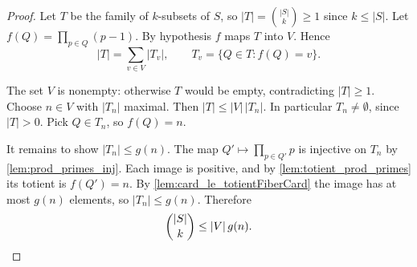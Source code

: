 \documentclass[11pt]{article}
\theoremstyle{definition}
\theoremstyle{remark}
\begin{document}
\begin{proof}
Let $T$ be the family of $k$-subsets of $S$, so $|T|=\binom{|S|}{k}\ge1$ since $k\le|S|$. Let $f(Q)=\prod_{p\in Q}(p-1)$. By hypothesis $f$ maps $T$ into $V$. Hence
\[
 |T|=\sum_{v\in V}|T_v|,\qquad T_v=\{Q\in T: f(Q)=v\}.
\]

The set $V$ is nonempty: otherwise $T$ would be empty, contradicting $|T|\ge1$. Choose $n\in V$ with $|T_n|$ maximal. Then $|T|\le|V|\,|T_n|$. In particular $T_n\neq\emptyset$, since $|T|>0$. Pick $Q\in T_n$, so $f(Q)=n$.

It remains to show $|T_n|\le g(n)$. The map $Q'\mapsto\prod_{p\in Q'}p$ is injective on $T_n$ by \cref{lem:prod_primes_inj}. Each image is positive, and by \cref{lem:totient_prod_primes} its totient is $f(Q')=n$. By \cref{lem:card_le_totientFiberCard} the image has at most $g(n)$ elements, so $|T_n|\le g(n)$. Therefore
\[
 \binom{|S|}{k}\le|V|\,g(n).\qedhere
\]
\end{proof}
\end{document}
